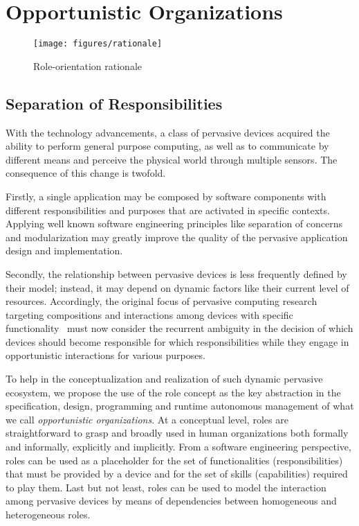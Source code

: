 \section{Opportunistic Organizations}\label{sec:edge_spaces}

\begin{figure*}[t!]
	\centering
	\texttt{[image: figures/rationale]}
	\caption{Role-orientation rationale}
	\label{fig:rationale}
\end{figure*}

\subsection{Separation of Responsibilities}

With the technology advancements, a class of pervasive devices acquired the ability to perform general purpose computing, as well as to communicate by different means and perceive the physical world through multiple sensors. The consequence of this change is twofold. 

Firstly, a single application may be composed by software components with different responsibilities and purposes that are activated in specific contexts. Applying well known software engineering principles like separation of concerns and modularization may greatly improve the quality of the pervasive application design and implementation.

Secondly, the relationship between pervasive devices is less frequently defined by their model; instead, it may depend on dynamic factors like their current level of resources. Accordingly, the original focus of pervasive computing research targeting compositions and interactions among devices with specific functionality~\cite{} must now consider the recurrent ambiguity in the decision of which devices should become responsible for which responsibilities while they engage in opportunistic interactions for various purposes. 


To help in the conceptualization and realization of such dynamic pervasive ecosystem, we propose the use of the role concept as the key abstraction in the specification, design, programming and runtime autonomous management of what we call \textit{opportunistic organizations}. At a conceptual level, roles are straightforward to grasp and broadly used in human organizations both formally and informally, explicitly and implicitly. From a software engineering perspective, roles can be used as a placeholder for the set of functionalities (responsibilities) that must be provided by a device and for the set of skills (capabilities) required to play them. Last but not least, roles can be used to model the interaction among pervasive devices by means of dependencies between homogeneous and heterogeneous roles.

